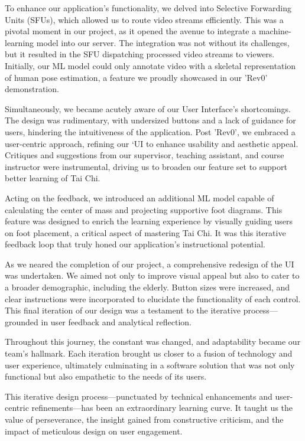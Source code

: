 \documentclass{article}
\begin{document}
To enhance our application's functionality, we delved into Selective Forwarding Units (SFUs), which allowed us to route video streams efficiently. 
This was a pivotal moment in our project, as it opened the avenue to integrate a machine-learning model into our server. 
The integration was not without its challenges, but it resulted in the SFU dispatching processed video streams to viewers. 
Initially, our ML model could only annotate video with a skeletal representation of human pose estimation, a feature we proudly showcased in our 'Rev0' demonstration.

Simultaneously, we became acutely aware of our User Interface's shortcomings. The design was rudimentary, with undersized buttons and a lack of guidance for users, hindering the intuitiveness of the application. 
Post 'Rev0', we embraced a user-centric approach, refining our `UI to enhance usability and aesthetic appeal. 
Critiques and suggestions from our supervisor, teaching assistant, and course instructor were instrumental, driving us to broaden our feature set to support better learning of Tai Chi.

Acting on the feedback, we introduced an additional ML model capable of calculating the center of mass and projecting supportive foot diagrams. 
This feature was designed to enrich the learning experience by visually guiding users on foot placement, a critical aspect of mastering Tai Chi. 
It was this iterative feedback loop that truly honed our application's instructional potential.

As we neared the completion of our project, a comprehensive redesign of the UI was undertaken. 
We aimed not only to improve visual appeal but also to cater to a broader demographic, including the elderly. 
Button sizes were increased, and clear instructions were incorporated to elucidate the functionality of each control. 
This final iteration of our design was a testament to the iterative process—grounded in user feedback and analytical reflection.

Throughout this journey, the constant was changed, and adaptability became our team's hallmark. 
Each iteration brought us closer to a fusion of technology and user experience, ultimately culminating in a software solution that was not only functional but also empathetic to the needs of its users.

This iterative design process—punctuated by technical enhancements and user-centric refinements—has been an extraordinary learning curve. 
It taught us the value of perseverance, the insight gained from constructive criticism, and the impact of meticulous design on user engagement.
\end{document}

